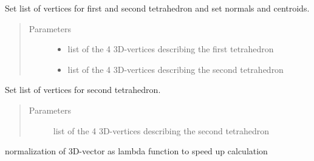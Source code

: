 \documentclass[letterpaper,10pt,english]{sphinxmanual}
\begin{document}
\begin{fulllineitems}
\begin{fulllineitems}
\label{\detokenize{pk_src.intersection_tet_tet:pk_src.intersection_tet_tet.intersection_tet_tet.setV1V2}}
Set list of vertices for first and second tetrahedron and set normals and centroids.
\begin{quote}\begin{description}
\item[{Parameters}] \leavevmode\begin{itemize}
\item {} 
 \textendash{} list of the 4 3D-vertices describing the first tetrahedron

\item {} 
 \textendash{} list of the 4 3D-vertices describing the second tetrahedron

\end{itemize}

\end{description}\end{quote}

\end{fulllineitems}


\begin{fulllineitems}
\label{\detokenize{pk_src.intersection_tet_tet:pk_src.intersection_tet_tet.intersection_tet_tet.setV2}}
Set list of vertices for second tetrahedron.
\begin{quote}\begin{description}
\item[{Parameters}] \leavevmode
{} \textendash{} list of the 4 3D-vertices describing the second tetrahedron

\end{description}\end{quote}

\end{fulllineitems}


\end{fulllineitems}


\begin{fulllineitems}
\label{\detokenize{pk_src.intersection_tet_tet:pk_src.intersection_tet_tet.normalize}}
normalization of 3D-vector as lambda function to speed up calculation

\end{fulllineitems}
\end{document}
